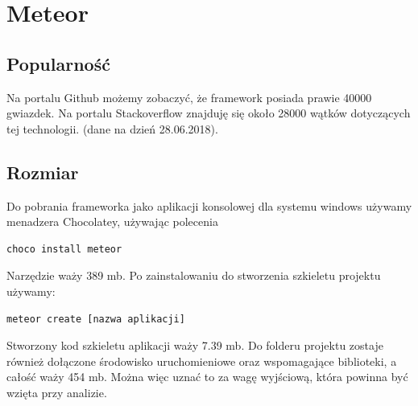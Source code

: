 \documentclass[12pt]{report}
\begin{document}
  \section{Meteor}

    \subsection{Popularność}
      Na portalu Github możemy zobaczyć, że framework posiada prawie 40000 gwiazdek.
      Na portalu Stackoverflow znajduję się około 28000 wątków dotyczących tej technologii.
      (dane na dzień 28.06.2018).

    \subsection{Rozmiar}
      Do pobrania frameworka jako aplikacji konsolowej dla systemu windows używamy menadzera Chocolatey, używając polecenia
      \begin{lstlisting}[language=bash,numbers=none]
        choco install meteor
      \end{lstlisting}
      Narzędzie waży 389 mb.
      Po zainstalowaniu do stworzenia szkieletu projektu używamy:
      \begin{lstlisting}[language=bash,numbers=none]
        meteor create [nazwa aplikacji]
      \end{lstlisting}
      Stworzony kod szkieletu aplikacji waży 7.39 mb.
      Do folderu projektu zostaje również dołączone środowisko uruchomieniowe oraz wspomagające biblioteki, a całość waży 454 mb.
      Można więc uznać to za wagę wyjściową, która powinna być wzięta przy analizie.
\end{document}
